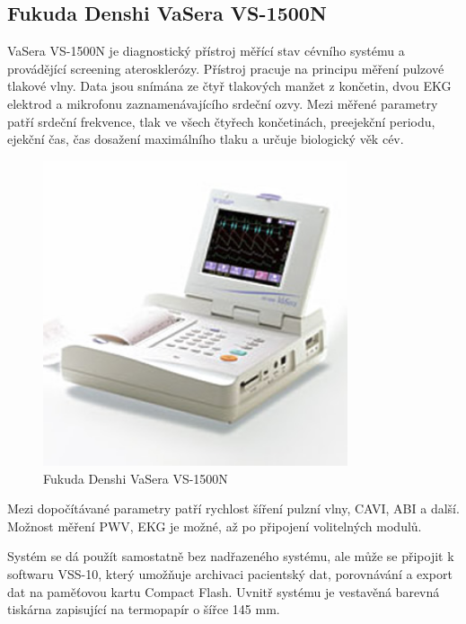 \subsection{Fukuda Denshi VaSera VS-1500N}
VaSera VS-1500N je diagnostický přístroj měřící stav cévního systému a provádějící screening aterosklerózy. Přístroj pracuje na principu měření pulzové tlakové vlny. Data jsou snímána ze čtyř tlakových manžet z končetin, dvou EKG elektrod a mikrofonu zaznamenávajícího srdeční ozvy.
Mezi měřené parametry patří srdeční frekvence, tlak ve všech čtyřech končetinách, preejekční periodu, ejekční čas, čas dosažení maximálního tlaku a určuje biologický věk cév.\cite{cite:Vasera}
\begin{figure}[H]
    \caption{Fukuda Denshi VaSera VS-1500N \cite{cite:Vasera}}
    \includegraphics[width=0.8\textwidth]{pictures/vs_1500n.jpg}
\end{figure}
Mezi dopočítávané parametry patří rychlost šíření pulzní vlny, CAVI, ABI a další. Možnost měření PWV, EKG je možné, až po připojení volitelných modulů.\cite{cite:Vasera}
\par
Systém se dá použít samostatně bez nadřazeného systému, ale může se připojit k softwaru VSS-10, který umožňuje archivaci pacientský dat, porovnávání a export dat na paměťovou kartu Compact Flash. Uvnitř systému je
vestavěná barevná tiskárna zapisující na termopapír o šířce 145 mm.\cite{cite:Vasera}
